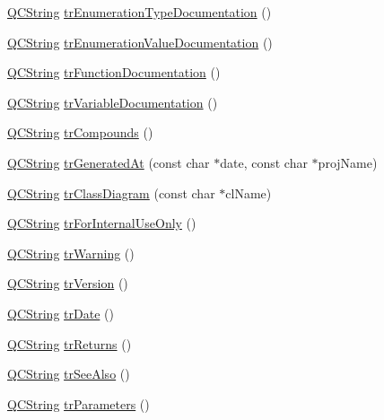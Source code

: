 \begin{DoxyCompactItemize}
\hyperlink{class_q_c_string}{Q\+C\+String} \hyperlink{class_translator_dutch_a15d0de556d505e1f878def0971ae13bf}{tr\+Enumeration\+Type\+Documentation} ()
\item 
\hyperlink{class_q_c_string}{Q\+C\+String} \hyperlink{class_translator_dutch_addc21c7549fdbc5c25cae088a57543f2}{tr\+Enumeration\+Value\+Documentation} ()
\item 
\hyperlink{class_q_c_string}{Q\+C\+String} \hyperlink{class_translator_dutch_af946e994702e909d2d93ff4f298b1016}{tr\+Function\+Documentation} ()
\item 
\hyperlink{class_q_c_string}{Q\+C\+String} \hyperlink{class_translator_dutch_a1f0c2e1bfb07ca8b9f05b106b3708ccc}{tr\+Variable\+Documentation} ()
\item 
\hyperlink{class_q_c_string}{Q\+C\+String} \hyperlink{class_translator_dutch_a64b1c7cbe25d5f4ac81d248ef209cdc0}{tr\+Compounds} ()
\item 
\hyperlink{class_q_c_string}{Q\+C\+String} \hyperlink{class_translator_dutch_a71fda8e35bca2a00703be5572accb969}{tr\+Generated\+At} (const char $\ast$date, const char $\ast$proj\+Name)
\item 
\hyperlink{class_q_c_string}{Q\+C\+String} \hyperlink{class_translator_dutch_a41a24a7286dc8a70a3372d8dc48d84c0}{tr\+Class\+Diagram} (const char $\ast$cl\+Name)
\item 
\hyperlink{class_q_c_string}{Q\+C\+String} \hyperlink{class_translator_dutch_ad607e64516709a16f8cd99db36ff13cd}{tr\+For\+Internal\+Use\+Only} ()
\item 
\hyperlink{class_q_c_string}{Q\+C\+String} \hyperlink{class_translator_dutch_a0f0e242d6738d0eb779aa55eeab133f0}{tr\+Warning} ()
\item 
\hyperlink{class_q_c_string}{Q\+C\+String} \hyperlink{class_translator_dutch_a4f6843a0a3c8510867025aaf98a936c7}{tr\+Version} ()
\item 
\hyperlink{class_q_c_string}{Q\+C\+String} \hyperlink{class_translator_dutch_ae6c0d2663dd28a303296b997a09e026a}{tr\+Date} ()
\item 
\hyperlink{class_q_c_string}{Q\+C\+String} \hyperlink{class_translator_dutch_a2ce6db53e7b316a67bc0178d5d0d0453}{tr\+Returns} ()
\item 
\hyperlink{class_q_c_string}{Q\+C\+String} \hyperlink{class_translator_dutch_a597ec967ff38aa0cc129fd998c51255b}{tr\+See\+Also} ()
\item 
\hyperlink{class_q_c_string}{Q\+C\+String} \hyperlink{class_translator_dutch_a07df4bd953b94f0262fd65469f6ed01e}{tr\+Parameters} ()
\item 

\end{DoxyCompactItemize}

